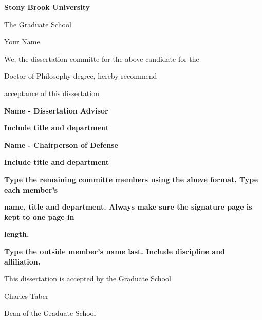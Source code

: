 \centerline{\bf{Stony Brook University}}
\vspace*{1\baselineskip}
\centerline{The Graduate School}
\vspace*{2\baselineskip}
\centerline{Your Name}
\vspace*{2\baselineskip}
\centerline{We, the dissertation committe for the above candidate for the}
\vspace*{1\baselineskip}
\centerline{Doctor of Philosophy degree, hereby recommend}
\vspace*{1\baselineskip}
\centerline{acceptance of this dissertation}
\vspace*{2\baselineskip}
\centerline{\bf{Name - Dissertation Advisor}}
\centerline{\bf{Include title and department}}
\vspace*{2\baselineskip}
\centerline{\bf{Name - Chairperson of Defense}}
\centerline{\bf{Include title and department}}
\vspace*{2\baselineskip}
\centerline{\bf{Type the remaining committe members using the above format. Type each member's}}
\centerline{\bf{name, title and department. Always make sure the signature page is kept to one page in}} 
\centerline{\bf{length.}}
\vspace*{1\baselineskip}
\centerline{\bf{Type the outside member's name last. Include discipline and affiliation.}}
\vspace*{2\baselineskip}
\centerline{This dissertation is accepted by the Graduate School}
\vspace*{3\baselineskip}
\centerline{Charles Taber}
\centerline{Dean of the Graduate School}

\newpage

